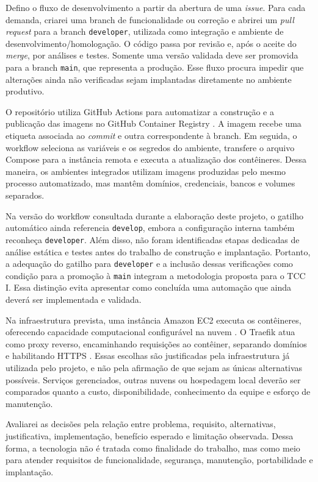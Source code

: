 Defino o fluxo de desenvolvimento a partir da abertura de uma \textit{issue}. Para cada demanda, criarei uma branch de funcionalidade ou correção e abrirei um \textit{pull request} para a branch \texttt{developer}, utilizada como integração e ambiente de desenvolvimento/homologação. O código passa por revisão e, após o aceite do \textit{merge}, por análises e testes. Somente uma versão validada deve ser promovida para a branch \texttt{main}, que representa a produção. Esse fluxo procura impedir que alterações ainda não verificadas sejam implantadas diretamente no ambiente produtivo.

O repositório utiliza GitHub Actions para automatizar a construção e a publicação das imagens no GitHub Container Registry \cite{GitHubActionsDocs,GitHubContainerRegistry}. A imagem recebe uma etiqueta associada ao \textit{commit} e outra correspondente à branch. Em seguida, o workflow seleciona as variáveis e os segredos do ambiente, transfere o arquivo Compose para a instância remota e executa a atualização dos contêineres. Dessa maneira, os ambientes integrados utilizam imagens produzidas pelo mesmo processo automatizado, mas mantêm domínios, credenciais, bancos e volumes separados.

Na versão do workflow consultada durante a elaboração deste projeto, o gatilho automático ainda referencia \texttt{develop}, embora a configuração interna também reconheça \texttt{developer}. Além disso, não foram identificadas etapas dedicadas de análise estática e testes antes do trabalho de construção e implantação. Portanto, a adequação do gatilho para \texttt{developer} e a inclusão dessas verificações como condição para a promoção à \texttt{main} integram a metodologia proposta para o TCC I. Essa distinção evita apresentar como concluída uma automação que ainda deverá ser implementada e validada.

Na infraestrutura prevista, uma instância Amazon EC2 executa os contêineres, oferecendo capacidade computacional configurável na nuvem \cite{AWSEC2Docs}. O Traefik atua como proxy reverso, encaminhando requisições ao contêiner, separando domínios e habilitando HTTPS \cite{TraefikDocs}. Essas escolhas são justificadas pela infraestrutura já utilizada pelo projeto, e não pela afirmação de que sejam as únicas alternativas possíveis. Serviços gerenciados, outras nuvens ou hospedagem local deverão ser comparados quanto a custo, disponibilidade, conhecimento da equipe e esforço de manutenção.

Avaliarei as decisões pela relação entre problema, requisito, alternativas, justificativa, implementação, benefício esperado e limitação observada. Dessa forma, a tecnologia não é tratada como finalidade do trabalho, mas como meio para atender requisitos de funcionalidade, segurança, manutenção, portabilidade e implantação.


